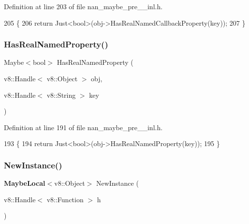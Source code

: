 Definition at line 203 of file nan\+\_\+maybe\+\_\+pre\+\_\+\_\+inl.\+h.


\begin{DoxyCode}
205                             \{
206   \textcolor{keywordflow}{return} Just<bool>(obj->HasRealNamedCallbackProperty(key));
207 \}
\end{DoxyCode}
\mbox{\label{nan__maybe__pre__43__inl_8h_ad04ac79b1545064884b4fcfcd979b349}} 
\subsubsection{Has\+Real\+Named\+Property()}
{\footnotesize\ttfamily Maybe$<$bool$>$ Has\+Real\+Named\+Property (\begin{DoxyParamCaption}\item[{v8\+::\+Handle$<$ v8\+::\+Object $>$}]{obj,  }\item[{v8\+::\+Handle$<$ v8\+::\+String $>$}]{key }\end{DoxyParamCaption})}



Definition at line 191 of file nan\+\_\+maybe\+\_\+pre\+\_\+\_\+inl.\+h.


\begin{DoxyCode}
193                             \{
194   \textcolor{keywordflow}{return} Just<bool>(obj->HasRealNamedProperty(key));
195 \}
\end{DoxyCode}
\mbox{\label{nan__maybe__pre__43__inl_8h_aef3a3b968410885184a32804e08b294e}} 
\subsubsection{New\+Instance()\hspace{0.1cm}{\footnotesize\ttfamily [1/3]}}
{\footnotesize\ttfamily \textbf{ Maybe\+Local}$<$v8\+::\+Object$>$ New\+Instance (\begin{DoxyParamCaption}\item[{v8\+::\+Handle$<$ v8\+::\+Function $>$}]{h }\end{DoxyParamCaption})}



